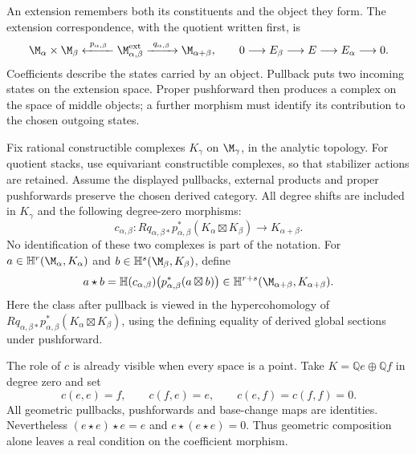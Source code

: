 An extension remembers both its constituents and the object they form.
The extension correspondence, with the quotient written first, is
\[
 \M_{\alpha}\times\M_{\beta}
 \xleftarrow{\ p_{\alpha,\beta}\ }\M_{\alpha,\beta}^{\mathrm{ext}}
 \xrightarrow{\ q_{\alpha,\beta}\ }\M_{\alpha+\beta},
 \qquad 0\longrightarrow E_\beta\longrightarrow E
 \longrightarrow E_\alpha\longrightarrow0.
\]
Coefficients describe the states carried by an object. Pullback puts two
incoming states on the extension space. Proper pushforward then produces a
complex on the space of middle objects; a further morphism must identify its
contribution to the chosen outgoing states.

Fix rational constructible complexes $K_\gamma$ on $\M_\gamma$, in the
analytic topology. For quotient stacks, use equivariant constructible
complexes, so that stabilizer actions are retained. Assume the displayed
pullbacks, external products and proper pushforwards preserve the chosen
derived category. All degree shifts are included in $K_\gamma$ and the
following degree-zero morphisms:
\[
 c_{\alpha,\beta}:Rq_{\alpha,\beta*}p_{\alpha,\beta}^*
 (K_\alpha\boxtimes K_\beta)\longrightarrow K_{\alpha+\beta}.
\]
No identification of these two complexes is part of the notation. For
$a\in\mathbb H^r(\M_\alpha,K_\alpha)$ and
$b\in\mathbb H^s(\M_\beta,K_\beta)$, define
\[
 a\star b=\mathbb H(c_{\alpha,\beta})\bigl(p_{\alpha,\beta}^*
 (a\boxtimes b)\bigr)
 \in\mathbb H^{r+s}(\M_{\alpha+\beta},K_{\alpha+\beta}).
\]
Here the class after pullback is viewed in the hypercohomology of
$Rq_{\alpha,\beta*}p_{\alpha,\beta}^*(K_\alpha\boxtimes K_\beta)$,
using the defining equality of derived global sections under pushforward.

The role of $c$ is already visible when every space is a point. Take
$K=\mathbb Qe\oplus\mathbb Qf$ in degree zero and set
\[
 c(e,e)=f,\qquad c(f,e)=e,\qquad c(e,f)=c(f,f)=0.
\]
All geometric pullbacks, pushforwards and base-change maps are identities.
Nevertheless $(e\star e)\star e=e$ and
$e\star(e\star e)=0$. Thus geometric composition alone leaves a real
condition on the coefficient morphism.


